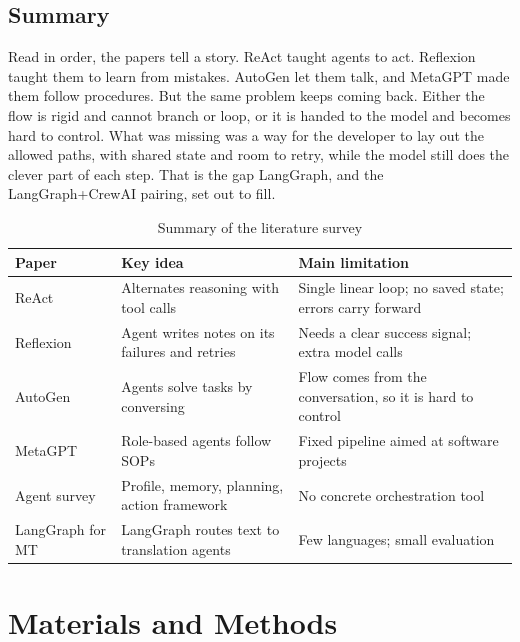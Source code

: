 \documentclass[12pt,a4paper]{report}
\begin{document}
\section*{Summary}

Read in order, the papers tell a story. ReAct taught agents to act. Reflexion taught them to learn from mistakes. AutoGen let them talk, and MetaGPT made them follow procedures. But the same problem keeps coming back. Either the flow is rigid and cannot branch or loop, or it is handed to the model and becomes hard to control. What was missing was a way for the developer to lay out the allowed paths, with shared state and room to retry, while the model still does the clever part of each step. That is the gap LangGraph, and the LangGraph+CrewAI pairing, set out to fill.

\begin{table}[H]
\centering
\renewcommand{\arraystretch}{1.3}
\caption{Summary of the literature survey}
\label{tab:lit}
\small
\begin{tabular}{|L{3.4cm}|L{5.2cm}|L{5.2cm}|}
\hline
\textbf{Paper} & \textbf{Key idea} & \textbf{Main limitation} \\\hline
ReAct \cite{yao2023react} & Alternates reasoning with tool calls & Single linear loop; no saved state; errors carry forward \\\hline
Reflexion \cite{shinn2023reflexion} & Agent writes notes on its failures and retries & Needs a clear success signal; extra model calls \\\hline
AutoGen \cite{wu2023autogen} & Agents solve tasks by conversing & Flow comes from the conversation, so it is hard to control \\\hline
MetaGPT \cite{hong2024metagpt} & Role-based agents follow SOPs & Fixed pipeline aimed at software projects \\\hline
Agent survey \cite{wang2023survey} & Profile, memory, planning, action framework & No concrete orchestration tool \\\hline
LangGraph for MT \cite{wang2024translation} & LangGraph routes text to translation agents & Few languages; small evaluation \\\hline
\end{tabular}
\end{table}

\chapter{Materials and Methods}
\end{document}
